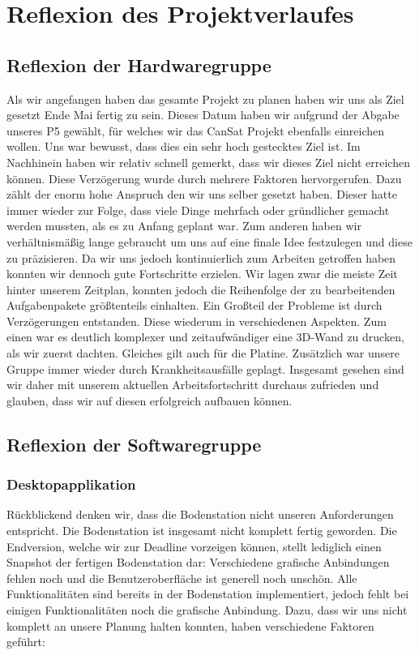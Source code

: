 \section{Reflexion des Projektverlaufes}
\subsection{Reflexion der Hardwaregruppe}
Als wir angefangen haben das gesamte Projekt zu planen haben wir uns als Ziel gesetzt Ende Mai fertig zu sein. Dieses Datum haben wir aufgrund der Abgabe unseres P5 gewählt, für welches wir das CanSat Projekt ebenfalls einreichen wollen. Uns war bewusst, dass dies ein sehr hoch gestecktes Ziel ist. Im Nachhinein haben wir relativ schnell gemerkt, dass wir dieses Ziel nicht erreichen können. Diese Verzögerung wurde durch mehrere Faktoren hervorgerufen. Dazu zählt der enorm hohe Anspruch den wir uns selber gesetzt haben. Dieser hatte immer wieder zur Folge, dass viele Dinge mehrfach oder gründlicher gemacht werden mussten, als es zu Anfang geplant war. Zum anderen haben wir verhältnismäßig lange gebraucht um uns auf eine finale Idee festzulegen und diese zu präzisieren. Da wir uns jedoch kontinuierlich zum Arbeiten getroffen haben konnten wir dennoch gute Fortschritte erzielen. Wir lagen zwar die meiste Zeit hinter unserem Zeitplan, konnten jedoch die Reihenfolge der zu bearbeitenden Aufgabenpakete größtenteils einhalten. Ein Großteil der Probleme ist durch Verzögerungen entstanden. Diese wiederum in verschiedenen Aspekten. Zum einen war es deutlich komplexer und zeitaufwändiger eine 3D-Wand zu drucken, als wir zuerst dachten. Gleiches gilt auch für die Platine. Zusätzlich war unsere Gruppe immer wieder durch Krankheitsausfälle geplagt. Insgesamt gesehen sind wir daher mit unserem aktuellen Arbeitsfortschritt durchaus zufrieden und glauben, dass wir auf diesen erfolgreich aufbauen können.

\subsection{Reflexion der Softwaregruppe}
\subsubsection{Desktopapplikation}
Rückblickend denken wir, dass die Bodenstation nicht unseren Anforderungen entspricht. Die Bodenstation ist insgesamt nicht komplett fertig geworden. Die Endversion, welche wir zur Deadline vorzeigen können, stellt lediglich einen Snapshot der fertigen Bodenstation dar: Verschiedene grafische Anbindungen fehlen noch und die Benutzeroberfläche ist generell noch unschön. Alle Funktionalitäten sind bereits in der Bodenstation implementiert, jedoch fehlt bei einigen Funktionalitäten noch die grafische Anbindung. Dazu, dass wir uns nicht komplett an unsere Planung halten konnten, haben verschiedene Faktoren geführt:

